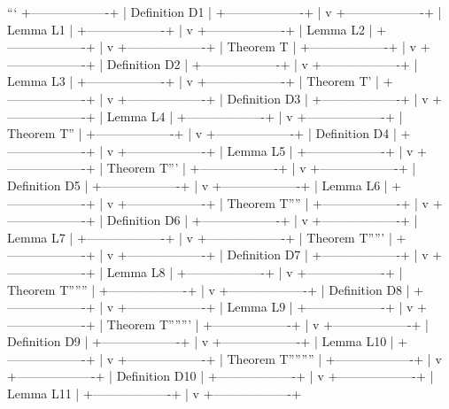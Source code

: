 ```
+-------------------+
| Definition D1     |
+-------------------+
        |
        v
+-------------------+
| Lemma L1          |
+-------------------+
        |
        v
+-------------------+
| Lemma L2          |
+-------------------+
        |
        v
+-------------------+
| Theorem T         |
+-------------------+
        |
        v
+-------------------+
| Definition D2     |
+-------------------+
        |
        v
+-------------------+
| Lemma L3          |
+-------------------+
        |
        v
+-------------------+
| Theorem T'        |
+-------------------+
        |
        v
+-------------------+
| Definition D3     |
+-------------------+
        |
        v
+-------------------+
| Lemma L4          |
+-------------------+
        |
        v
+-------------------+
| Theorem T''       |
+-------------------+
        |
        v
+-------------------+
| Definition D4     |
+-------------------+
        |
        v
+-------------------+
| Lemma L5          |
+-------------------+
        |
        v
+-------------------+
| Theorem T'''      |
+-------------------+
        |
        v
+-------------------+
| Definition D5     |
+-------------------+
        |
        v
+-------------------+
| Lemma L6          |
+-------------------+
        |
        v
+-------------------+
| Theorem T''''     |
+-------------------+
        |
        v
+-------------------+
| Definition D6     |
+-------------------+
        |
        v
+-------------------+
| Lemma L7          |
+-------------------+
        |
        v
+-------------------+
| Theorem T'''''    |
+-------------------+
        |
        v
+-------------------+
| Definition D7     |
+-------------------+
        |
        v
+-------------------+
| Lemma L8          |
+-------------------+
        |
        v
+-------------------+
| Theorem T''''''   |
+-------------------+
        |
        v
+-------------------+
| Definition D8     |
+-------------------+
        |
        v
+-------------------+
| Lemma L9          |
+-------------------+
        |
        v
+-------------------+
| Theorem T'''''''  |
+-------------------+
        |
        v
+-------------------+
| Definition D9     |
+-------------------+
        |
        v
+-------------------+
| Lemma L10         |
+-------------------+
        |
        v
+-------------------+
| Theorem T'''''''' |
+-------------------+
        |
        v
+-------------------+
| Definition D10    |
+-------------------+
        |
        v
+-------------------+
| Lemma L11         |
+-------------------+
        |
        v
+-------------------+
